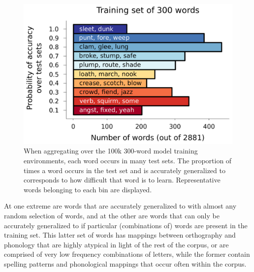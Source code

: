 \documentclass[10pt,letterpaper]{article}
\begin{document}
\begin{figure}[t]
	\includegraphics[width=0.9\columnwidth]{figures/word_accuracy_over_testsets.png}

	\caption{When aggregating over the 100k 300-word model training environments, each word occurs in many test sets. The proportion of times a word occurs in the test set and is accurately generalized to corresponds to how difficult that word is to learn. Representative words belonging to each bin are displayed.}
	\label{word_acc_hist}
\end{figure}

At one extreme are words that are accurately generalized to with almost any random selection of words, and at the other are words that can only be accurately generalized to if particular (combinations of) words are present in the training set. This latter set of words has mappings between orthography and phonology that are highly atypical in light of the rest of the corpus, or are comprised of very low frequency combinations of letters, while the former contain spelling patterns and phonological mappings that occur often within the corpus.
\end{document}
